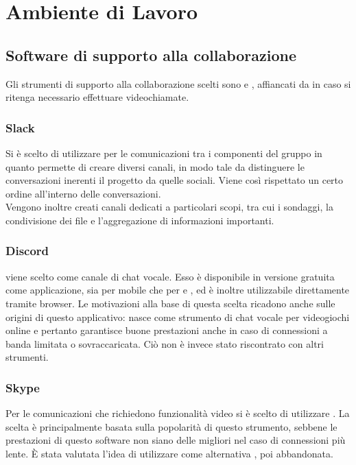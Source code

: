 \section{Ambiente di Lavoro}

\subsection{Software di supporto alla collaborazione}
Gli strumenti di supporto alla collaborazione scelti sono  e , affiancati da  in caso si ritenga necessario effettuare videochiamate.

\subsubsection{Slack}
Si è scelto di utilizzare  per le comunicazioni tra i componenti del gruppo in quanto permette di creare diversi canali, in modo tale da distinguere le conversazioni inerenti il progetto da quelle sociali. Viene così rispettato un certo ordine all'interno delle conversazioni.\\
Vengono inoltre creati canali dedicati a particolari scopi, tra cui i sondaggi, la condivisione dei file e l'aggregazione di informazioni importanti.

\subsubsection{Discord}
 viene scelto come canale di chat vocale. Esso è disponibile in versione gratuita come applicazione, sia per mobile che per  e , ed è inoltre utilizzabile direttamente tramite browser. Le motivazioni alla base di questa scelta ricadono anche sulle origini di questo applicativo:  nasce come strumento di chat vocale per videogiochi online e pertanto garantisce buone prestazioni anche in caso di connessioni a banda limitata o sovraccaricata. Ciò non è invece stato riscontrato con altri strumenti.

\subsubsection{Skype}
Per le comunicazioni che richiedono funzionalità video si è scelto di utilizzare . La scelta è principalmente basata sulla popolarità di questo strumento, sebbene le prestazioni di questo software non siano delle migliori nel caso di connessioni più lente. \`{E} stata valutata l'idea di utilizzare come alternativa , poi abbandonata.

